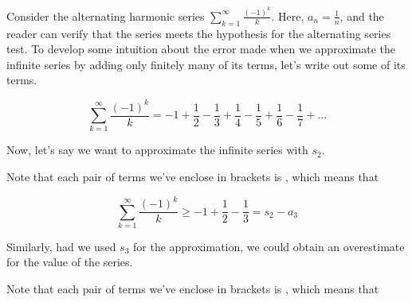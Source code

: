 \documentclass{ximera}
\begin{document}
\begin{model}
Consider the alternating harmonic series $\sum_{k=1}^{\infty} \frac{(-1)^k}{k}$.  Here, $a_n = \frac{1}{n}$, and the reader can verify that the series meets the hypothesis for the alternating series test.  To develop some intuition about the error made when we approximate the infinite series by adding only finitely many of its terms, let's write out some of its terms.

\[
\sum_{k=1}^{\infty} \frac{(-1)^k}{k} = -1+\frac{1}{2}-\frac{1}{3}+\frac{1}{4}-\frac{1}{5}+\frac{1}{6}-\frac{1}{7} + \ldots
\]

Now, let's say we want to approximate the infinite series with $s_2$.

\begin{image}
  \end{image}
  
  Note that each pair of terms we've enclose in brackets is , which means that
  
  \[
  \sum_{k=1}^{\infty} \frac{(-1)^k}{k} \geq -1+\frac{1}{2}-\frac{1}{3} = s_2 -a_3
  \]
  
  Similarly, had we used $s_3$ for the approximation, we could obtain an overestimate for the value of the series.
  
  \begin{image}
  \end{image}
  
    Note that each pair of terms we've enclose in brackets is , which means that
  

\end{model}
\end{document}
